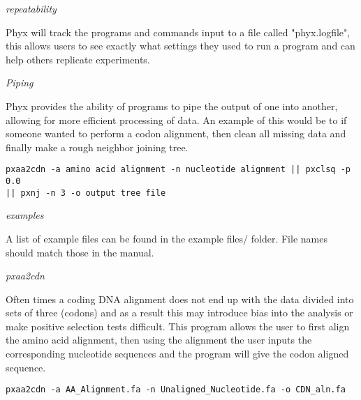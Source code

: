 \documentclass[12pt,letterpaper]{article}
\renewcommand{\subsection}[1]{%
\bigskip
\begin{center}
\begin{large}
\normalfont\itshape #1
\end{large}
\end{center}}
\begin{document}
\subsection{repeatability}

Phyx will track the programs and commands input to a file called "phyx.logfile", this allows users to see exactly what settings they used to run a program and can help others replicate experiments.

\subsection{Piping}

Phyx provides the ability of programs to pipe the output of one into another, allowing for more efficient processing of data. An example of this would be to if someone wanted to perform a codon alignment, then clean all missing data and finally make a rough neighbor joining tree.
\begin{flushleft}
\begin{verbatim}
pxaa2cdn -a amino acid alignment -n nucleotide alignment || pxclsq -p 0.0 
|| pxnj -n 3 -o output tree file
\end{verbatim}
\end{flushleft}

\subsection{examples}

A list of example files can be found in the example files/ folder. File names should match those in the manual.

\subsection{pxaa2cdn}

Often times a coding DNA alignment does not end up with the data divided into sets of three (codons) and as a result this may introduce bias into the analysis or make positive selection tests difficult. This program allows the user to first align the amino acid alignment, then using the alignment the user inputs the corresponding nucleotide sequences and the program will give the codon aligned sequence.
\begin{flushleft}
\begin{verbatim}
pxaa2cdn -a AA_Alignment.fa -n Unaligned_Nucleotide.fa -o CDN_aln.fa
\end{verbatim}
\end{flushleft}
\end{document}
